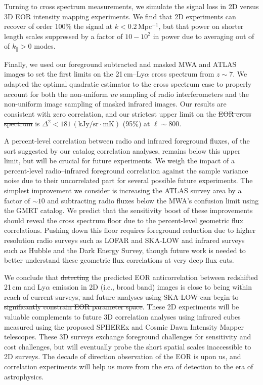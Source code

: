 \documentclass[numberedappendix]{emulateapj}
\providecommand{\DIFadd}[1]{{\protect\color{blue}\uwave{#1}}} %
\providecommand{\DIFdel}[1]{{\protect\color{red}\sout{#1}}}                      %
\providecommand{\DIFaddbegin}{} %
\providecommand{\DIFaddend}{} %
\providecommand{\DIFdelbegin}{} %
\providecommand{\DIFdelend}{} %
\begin{document}
Turning to cross spectrum measurements, we simulate the signal loss in 2D versus 3D EOR intensity mapping experiments. We find that 2D experiments can recover of order 100\% the signal at $k<0.2$\,Mpc$^{-1}$, but that power on shorter length scales  suppressed by a factor of $10-10^2$ in power due to averaging out of of $k_\parallel>0$ modes. 

Finally, we used our foreground subtracted and masked MWA and ATLAS images to set the first limits on the 21\,cm--Ly$\alpha$ cross spectrum from $z\sim7$. We adapted the optimal quadratic estimator to the cross spectrum case to properly account for both the non-uniform $uv$ sampling of radio interferometers and the non-uniform image  sampling of masked infrared images. Our results are consistent with zero correlation, and our strictest upper limit on the \DIFdelbegin \DIFdel{EOR cross spectrum }\DIFdelend \DIFaddbegin \DIFadd{cross spectrum of 21cm/Ly$\alpha$ foregrounds }\DIFaddend is $\Delta^2<181$\,$(\text{kJy/sr}\cdot \text{mK})$ (95\%) at $\ell\sim800$.

A percent-level correlation between radio and infrared foreground fluxes, of the sort suggested by our catalog correlation analyses, remains below this upper limit, but will be crucial for future experiments. We weigh the impact of a percent-level radio--infrared foreground correlation against the sample variance noise due to their uncorrelated part for several possible future experiments. The simplest improvement we consider is increasing the ATLAS survey area by a factor of $\sim10$ and subtracting radio fluxes below the MWA's confusion limit using the GMRT catalog. We predict that the sensitivity boost of these improvements should reveal the cross spectrum floor due to the percent-level geometric flux correlations. Pushing down this floor requires foreground reduction due to higher resolution radio surveys such as LOFAR and SKA-LOW and infrared surveys such as Hubble and the Dark Energy Survey, though future work is needed to better understand these geometric flux correlations at very deep flux cuts.

We conclude that \DIFdelbegin \DIFdel{detecting }\DIFdelend \DIFaddbegin \DIFadd{detection of }\DIFaddend the predicted EOR anticorrelation between redshifted 21\,cm and Ly$\alpha$ emission in 2D (i.e., broad band) images is close to being within reach of \DIFdelbegin \DIFdel{current surveys, and future analyses using SKA-LOW can begin to significantly constrain EOR parameter space}\DIFdelend \DIFaddbegin \DIFadd{future surveys}\DIFaddend . These 2D experiments will be valuable complements to future 3D correlation analyses using infrared cubes measured using the proposed SPHEREx and Cosmic Dawn Intensity Mapper telescopes. These 3D surveys exchange foreground challenges for sensitivity and cost challenges, but will eventually probe the short spatial scales inaccessible to 2D surveys. The decade of direction observation of the EOR is upon us, and correlation experiments will help us move from the era of detection to the era of astrophysics.
\end{document}
